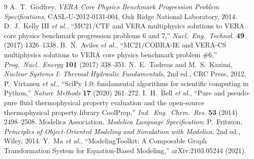 \documentclass[10pt,twocolumn]{article}
\begin{document}
\begin{thebibliography}{9}\small
{} A.~T.~Godfrey, \emph{VERA Core Physics Benchmark
Progression Problem Specifications}, CASL-U-2012-0131-004, Oak Ridge
National Laboratory, 2014.
 D.~J.~Kelly III \emph{et al.}, ``MC21/CTF and VERA
multiphysics solutions to VERA core physics benchmark progression
problems 6 and 7,'' \emph{Nucl.\ Eng.\ Technol.} \textbf{49} (2017)
1326--1338.
 B.~N.~Aviles \emph{et al.}, ``MC21/COBRA-IE and
VERA-CS multiphysics solutions to VERA core physics benchmark problem
\#6,'' \emph{Prog.\ Nucl.\ Energy} \textbf{101} (2017) 338--351.
 N.~E.~Todreas and M.~S.~Kazimi, \emph{Nuclear Systems
I: Thermal Hydraulic Fundamentals}, 2nd ed., CRC Press, 2012.
 P.~Virtanen \emph{et al.}, ``SciPy 1.0: fundamental
algorithms for scientific computing in Python,'' \emph{Nature Methods}
\textbf{17} (2020) 261--272.
 I.~H.~Bell \emph{et al.}, ``Pure and pseudo-pure fluid
thermophysical property evaluation and the open-source thermophysical
property library CoolProp,'' \emph{Ind.\ Eng.\ Chem.\ Res.} \textbf{53}
(2014) 2498--2508.
 Modelica Association, \emph{Modelica Language
Specification}; P.~Fritzson, \emph{Principles of Object-Oriented Modeling
and Simulation with Modelica}, 2nd ed., Wiley, 2014.
 Y.~Ma \emph{et al.}, ``ModelingToolkit: A Composable Graph
Transformation System for Equation-Based Modeling,'' arXiv:2103.05244 (2021).
\end{thebibliography}
\end{document}
